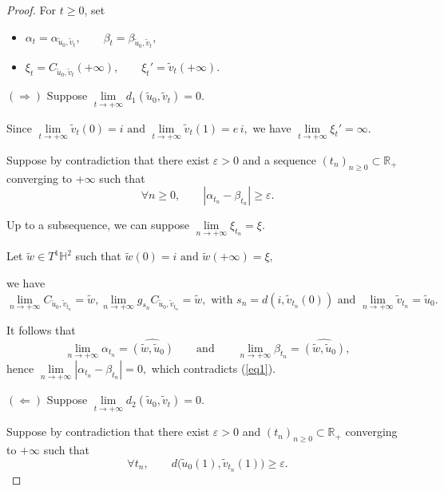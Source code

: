 \documentclass[10pt,a4paper]{amsart}
\begin{document}
\begin{proof}

For $t\geq 0$, set
\begin{itemize}
	
	\item$ \alpha_{t}=\alpha_{\tilde u_{0},\tilde v_{t}},
	\qquad
	\beta_{t}=\beta_{\tilde u_{0},\tilde v_{t}},
	$
	\item $\xi_{t}=C_{\tilde u_{0},\tilde v_{t}}(+\infty),
	\qquad
	\xi_{t}'=\tilde v_{t}(+\infty).
	$
\end{itemize}
\medskip

\noindent
$\left( \Longrightarrow \right)$ Suppose $
\lim\limits_{t\to+\infty} d_{1}(\tilde u_{0},\tilde v_{t})=0.
$

Since $
\lim\limits_{t\to+\infty}\tilde v_{t}(0)=i
\text{ and }
\lim\limits_{t\to+\infty}\tilde v_{t}(1)=e\,i,
$
we have $
\lim\limits_{t\to+\infty}\xi_{t}'=\infty.
$

Suppose by contradiction that there exist $\varepsilon>0$ and a sequence $(t_{n})_{n\geq 0}\subset\mathbb R_{+}$
converging to $+\infty$ such that
\begin{equation}\label{eq1}
	\forall n\geq 0,\qquad |\alpha_{t_{n}}-\beta_{t_{n}}|\geq \varepsilon.
\end{equation}

Up to a subsequence, we can suppose $
\lim\limits_{n\to+\infty}\xi_{t_{n}}=\xi.
$

Let $\tilde w\in T^{1}\mathbb H^{2}$ such that
$
\tilde w(0)=i
\text{ and }
\tilde w(+\infty)=\xi,
$

we have
$
\lim\limits_{n\to+\infty} C_{\tilde u_{0},\tilde v_{t_{n}}}=\tilde w,
\lim\limits_{n\to+\infty}g_{s_n}C_{\tilde u_0,\tilde v_{t_n}}=\tilde w, \text{ with } s_n=d(i,\tilde v_{t_n}(0))
\text{ and }
\lim\limits_{n\to+\infty}\tilde v_{t_{n}}=\tilde u_{0}.
$

It follows that
\[
\lim\limits_{n\to+\infty}\alpha_{t_{n}}=\widehat{(\tilde w,\tilde u_{0})}
\qquad\text{and}\qquad
\lim\limits_{n\to+\infty}\beta_{t_{n}}=\widehat{(\tilde w,\tilde u_{0})},
\]
hence
$
\lim\limits_{n\to+\infty}|\alpha_{t_{n}}-\beta_{t_{n}}|=0,
$
which contradicts (\ref{eq1}).

\medskip

\noindent
$\left( \Longleftarrow \right)$ Suppose
$
\lim\limits_{t\to+\infty} d_{2}(\tilde u_{0},\tilde v_{t})=0.
$

Suppose by contradiction that there exist $\varepsilon>0$ and $(t_{n})_{n\geq 0}\subset\mathbb R_{+}$
converging to $+\infty$ such that
\begin{equation}\label{eq2}
	\forall t_{n},\qquad d\bigl(\tilde u_{0}(1),\tilde v_{t_{n}}(1)\bigr)\geq \varepsilon.
\end{equation}


\end{proof}
\end{document}
